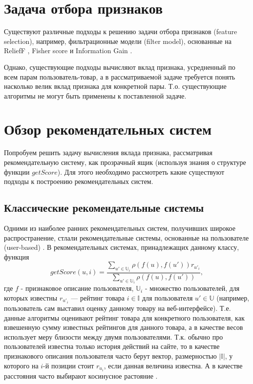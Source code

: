 \documentclass[12pt,a4paper]{report}
\begin{document}
\section{Задача отбора признаков}
Существуют различные подходы к решению задачи отбора признаков (feature selection), например, фильтрационные модели (filter model), основанные на ReliefF \cite{ReliefF}, Fisher score \cite{Fisher} и Information Gain \cite{Gain}.

Однако, существующие подходы вычисляют вклад признака, усредненный по всем парам пользователь-товар, а в рассматриваемой задаче требуется понять насколько велик вклад признака для конкретной пары.
Т.о. существующие алгоритмы не могут быть применены к поставленной задаче.

\section{Обзор рекомендательных систем}
Попробуем решить задачу вычисления вклада признака, рассматривая рекомендательную систему, как прозрачный ящик (используя знания о структуре функции $getScore$). Для этого необходимо рассмотреть какие существуют подходы к построению рекомендательных систем.

\subsection{Классические рекомендательные системы}
Одними из наиболее ранних рекомендательных систем, получивших широкое распространение, стлали рекомендательные системы, основанные на пользователе (user-based) \cite{Ubrs}. В рекомендательных системах, принадлежащих данному классу, функция
\begin{equation*}
getScore(u, i) = \frac{\sum_{u' \in \mathbb{U}_i} \rho(f(u), f(u')) r_{u'_i}}{\sum_{u' \in \mathbb{U}_i} \rho(f(u), f(u')) },
\end{equation*}
где $f$ - признаковое описание пользователя, $\mathbb{U}_i$ -  множество пользователей, для которых известны $r_{u'_i}$ --- рейтинг товара $i \in \mathbb{I} $ для пользователя $u' \in \mathbb{U}$ (например, пользователь сам выставил оценку данному товару на веб-интерфейсе). Т.е. данные алгоритмы оценивают рейтинг товара для конкретного пользователя, как взвешенную сумму известных рейтингов для данного товара, а в качестве весов использует меру близости между двумя пользователями. Т.к. обычно про пользователей известна только история действий на сайте, то в качестве признакового описания пользователя часто берут вектор, размерностью $|\mathbb{I}|$, у которого на $i$-й позиции стоит $r_{u_i}$, если данная величина известна. А в качестве расстояния часто выбирают косинусное растояние \cite{Cos}.
\end{document}

